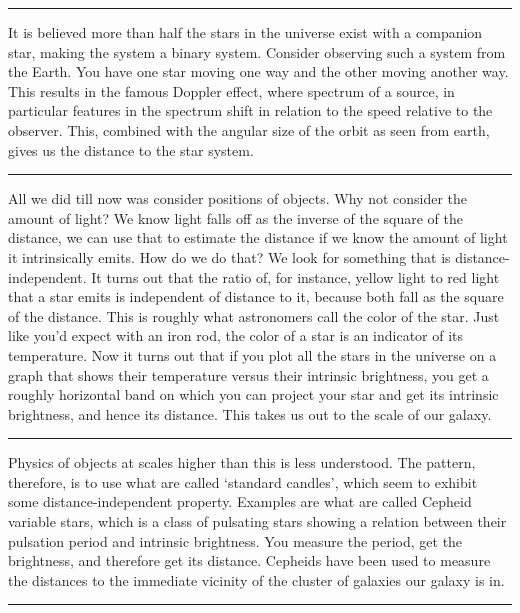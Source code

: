 \documentclass[11pt]{article}
\begin{document}
\noindent\rule[0.5ex]{\linewidth}{1pt}

\noindent It is believed more than half the stars in the universe exist with a companion star, making the system a binary system. Consider observing such a system from the Earth. You have one star moving one way and the other moving another way. This results in the famous Doppler effect, where spectrum of a source, in particular features in the spectrum shift in relation to the speed relative to the observer. This, combined with the angular size of the orbit as seen from earth, gives us the distance to the star system.

\noindent\rule[0.5ex]{\linewidth}{1pt}

\noindent All we did till now was consider positions of objects. Why not consider the amount of light? We know light falls off as the inverse of the square of the distance, we can use that to estimate the distance if we know the amount of light it intrinsically emits. How do we do that? We look for something that is distance-independent. It turns out that the ratio of, for instance, yellow light to red light that a star emits is independent of distance to it, because both fall as the square of the distance. This is roughly what astronomers call the color of the star. Just like you'd expect with an iron rod, the color of a star is an indicator of its temperature. Now it turns out that if you plot all the stars in the universe on a graph that shows their temperature versus their intrinsic brightness, you get a roughly horizontal band on which you can project your star and get its intrinsic brightness, and hence its distance.  This takes us out to the scale of our galaxy.

\noindent\rule[0.5ex]{\linewidth}{1pt}

\noindent Physics of objects at scales higher than this is less understood. The pattern, therefore, is to use what are called `standard candles', which seem to exhibit some distance-independent property. Examples are what are called Cepheid variable stars, which is a class of pulsating stars showing a relation between their pulsation period and intrinsic brightness. You measure the period, get the brightness, and therefore get its distance. Cepheids have been used to measure the distances to the immediate vicinity of the cluster of galaxies our galaxy is in.

\noindent\rule[0.5ex]{\linewidth}{0.5pt}
\end{document}
